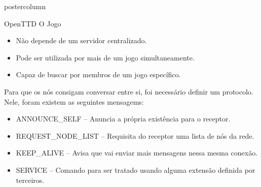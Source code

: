 \documentclass[final]{beamer}
\newlength{\columnheight}
\begin{document}
\begin{frame}
\begin{columns}
    \begin{column}{.5\textwidth}
      \begin{beamercolorbox}[center,wd=\textwidth]{postercolumn}
        \begin{minipage}[T]{.95\textwidth} %
          \parbox[t][\columnheight]{\textwidth}{ %
            
            \vspace*{0.8cm}
            
            \begin{block}{OpenTTD}
                O Jogo
                \begin{itemize}
                  \item Não depende de um servidor centralizado.
                  \item Pode ser utilizada por mais de um jogo simultaneamente.
                  \item Capaz de buscar por membros de um jogo específico.
                \end{itemize}
                
                \vspace*{0.5cm}
                Para que os nós consigam conversar entre si, foi necessário definir um protocolo. 
                Nele, foram existem as seguintes mensagems:
                \begin{itemize}
                  \item ANNOUNCE\_SELF -- Anuncia a própria existência para o receptor.
                  \item REQUEST\_NODE\_LIST -- Requisita do receptor uma lista de nós da rede.
                  \item KEEP\_ALIVE -- Avisa que vai enviar mais mensagens nessa mesma conexão.
                  \item SERVICE -- Comando para ser tratado usando alguma extensão definida por terceiros.
                \end{itemize}
                
                \vspace*{0.2cm}
                

\end{block}}
\end{minipage}
\end{beamercolorbox}
\end{column}
\end{columns}
\end{frame}
\end{document}
